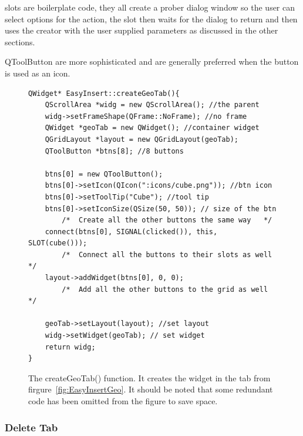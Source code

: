slots are boilerplate code, they all create a prober dialog window so the user can select options for the action, the slot then waits for the dialog to return and then uses the creator with the user supplied parameters as discussed in the other sections.

QToolButton are more sophisticated and are generally preferred when the button is used as an icon.


\begin{figure}[h] %
\centering
\lstset{language=C++} 
\begin{lstlisting}[frame=single]  
QWidget* EasyInsert::createGeoTab(){
	QScrollArea *widg = new QScrollArea(); //the parent
    widg->setFrameShape(QFrame::NoFrame); //no frame
    QWidget *geoTab = new QWidget(); //container widget
    QGridLayout *layout = new QGridLayout(geoTab);
    QToolButton *btns[8]; //8 buttons

    btns[0] = new QToolButton();
    btns[0]->setIcon(QIcon(":icons/cube.png")); //btn icon
    btns[0]->setToolTip("Cube"); //tool tip
    btns[0]->setIconSize(QSize(50, 50)); // size of the btn
    	/*  Create all the other buttons the same way   */
    connect(btns[0], SIGNAL(clicked()), this, SLOT(cube()));
 		/*  Connect all the buttons to their slots as well  */
    layout->addWidget(btns[0], 0, 0);
		/*  Add all the other buttons to the grid as well  */    
  
    geoTab->setLayout(layout); //set layout
    widg->setWidget(geoTab); // set widget
    return widg;
}
\end{lstlisting}
\caption{The createGeoTab() function. It creates the widget in the tab from firgure~\ref{fig:EasyInsertGeo}. It should be noted that some redundant code has been omitted from the figure to save space.}
\label{fig:geoTabCode} 	
\end{figure}

\subsubsection{Delete Tab}
\label{sec:DelTab}


